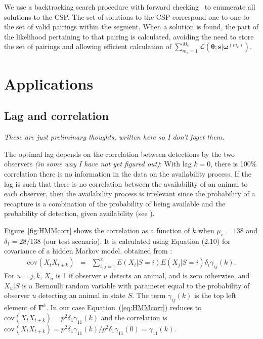 \documentclass[useAMS, usenatbib, referee]{biom}
\begin{document}
We use a backtracking search procedure with forward checking~\cite[Chapter 6]{russell-norvig-aima3} to enumerate all solutions to the CSP. The set of solutions to the CSP correspond one-to-one to the set of valid pairings within the segment. When a solution is found, the part of the likelihood pertaining to that pairing is calculated, avoiding the need to store the set of pairings and allowing efficient calculation of \(\sum_{m_c=1}^{M_c}\mathcal{L}(\bm{\theta};\bm{s}|\bm{\omega}^{(m_c)})\).

\section{Applications \label{sec:applic}}

\subsection{Lag and correlation}

\textit{These are just preliminary thoughts, written here so I don't foget them.}

The optimal lag depends on the correlation between detections by the two observers \textit{(in some way I have not yet figured out)}: With lag $k=0$, there is 100\% correlation there is no information in the data on the availability process. If the lag is such that there is no correlation between the availability of an animal to each observer, then the availability process is irrelevant since the probability of a  recapture is a combination of the probability of being available and the probability of detection, given availability (see \cite{Hayes+Buckland:83}).

Figure~\ref{fig:HMMcorr} shows the correlation as a function of $k$ when $\mu_c=138$ and $\delta_1=28/138$ (our test scenario). It is calculated using Equation (2.10) for covariance of a hidden Markov model, obtained from \cite{Zucchini+MacDonald:09}:
\begin{eqnarray}
\mbox{cov}(X_tX_{t+k})&=&\sum_{i,j=1}^2E(X_i|S=i)E(X_j|S=i)\delta_i\gamma_{ij}(k).
\label{eq:HMMcorr}
\end{eqnarray}
\noindent
For $u=j,k$, $X_u$ is 1 if observer $u$ detects an animal, and is zero otherwise, and $X_u|S$ is a Bernoulli random variable with parameter equal to the probability of observer $u$ detecting an animal in state $S$. The term $\gamma_{ij}(k)$ is the top left element of $\bm{\Gamma}^k$. In our case Equation~(\ref{eq:HMMcorr}) reduces to $\mbox{cov}(X_tX_{t+k})=p^2\delta_1\gamma_{11}(k)$ and the correlation is $\mbox{cov}(X_tX_{t+k})=p^2\delta_1\gamma_{11}(k)/p^2\delta_1\gamma_{11}(0)=\gamma_{11}(k)$.
\end{document}

